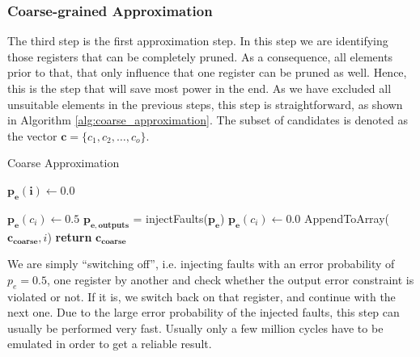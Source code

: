 \documentclass[conference]{IEEEtran}
\begin{document}
\subsubsection{Coarse-grained Approximation}
The third step is the first approximation step. In this step we are identifying those registers that can be completely pruned. As a consequence, all elements prior to that, that only influence that one register can be pruned as well. Hence, this is the step that will save most power in the end. As we have excluded all unsuitable elements in the previous steps, this step is straightforward, as shown in Algorithm \ref{alg:coarse_approximation}. The subset of candidates is denoted as the vector $\mathbf{c} = \{c_1,c_2,\ldots,c_{o}\}$.
\begin{algorithm}
  \caption{Coarse Approximation}\label{alg:coarse_approximation}
  \begin{algorithmic}[1]
    \State $\mathbf{p_e(i)} \gets 0.0$
    \EndFor

    \State $\mathbf{p_e}(c_i) \gets 0.5$
    \State $\mathbf{p_{e,outputs}}$ = injectFaults($\mathbf{p_e}$)
    \State $\mathbf{p_e}(c_i) \gets 0.0$
    \Else
    \State AppendToArray($\mathbf{c_{coarse}},i$)
    \EndIf
    \EndFor
    \State \textbf{return} $\mathbf{c_{coarse}}$ 
    \EndProcedure
  \end{algorithmic}
\end{algorithm}
We are simply ``switching off'', i.e. injecting faults with an error probability of $p_e=0.5$, one register by another and check whether the output error constraint is violated or not. If it is, we switch back on that register, and continue with the next one. Due to the large error probability of the injected faults, this step can usually be performed very fast. Usually only a few million cycles have to be emulated in order to get a reliable result.
\end{document}
